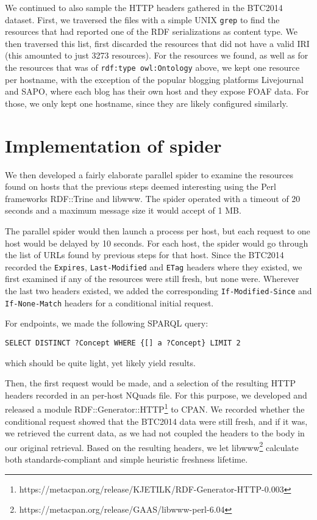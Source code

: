 \documentclass{article}
\newcommand{\rdfterm}[1]{\texttt{#1}}
\newcommand{\httph}[1]{\texttt{#1}}
\begin{document}
We continued to also sample the HTTP headers gathered in the BTC2014
dataset. 
First, we traversed the files with a simple UNIX \texttt{grep} to find
the resources that had reported one of the RDF serializations as
content type. We then traversed this list, first discarded the
resources that did not have a valid IRI (this amounted to just 3273
resources). For the resources we found, as well as for the resources
that was of \rdfterm{rdf:type owl:Ontology} above, we kept one
resource per hostname, with the exception of the popular blogging
platforms Livejournal and SAPO, where each blog has their own host and
they expose FOAF data. For those, we only kept one hostname, since
they are likely configured similarly. 

\section{Implementation of spider}\label{app:fetcher}

We then developed a fairly elaborate parallel spider to examine the
resources found on hosts that the previous steps deemed interesting
using the Perl frameworks RDF::Trine and libwww. The spider operated
with a timeout of 20 seconds and a maximum message size it would
accept of 1 MB.

The parallel spider would then launch a process per host, but each
request to one host would be delayed by 10 seconds. For each host, the
spider would go through the list of URLs found by previous steps for
that host. Since the BTC2014 recorded the \httph{Expires},
\httph{Last-Modified} and \httph{ETag} headers where they existed, we
first examined if any of the resources were still fresh, but none
were. Wherever the last two headers existed, we added the
corresponding \httph{If-Modified-Since} and \httph{If-None-Match}
headers for a conditional initial request.




For endpoints, we made the following SPARQL query:
\begin{verbatim}
SELECT DISTINCT ?Concept WHERE {[] a ?Concept} LIMIT 2
\end{verbatim}
which should be quite light, yet likely yield results.

Then, the first request would be made, and a selection of the
resulting HTTP headers recorded in an per-host NQuads file. For this
purpose, we developed and released a module
RDF::Generator::HTTP\footnote{https://metacpan.org/release/KJETILK/RDF-Generator-HTTP-0.003}
to CPAN. We recorded whether the conditional request showed that the
BTC2014 data were still fresh, and if it was, we retrieved the current
data, as we had not coupled the headers to the body in our original
retrieval.  Based on the resulting headers, we let
libwww\footnote{https://metacpan.org/release/GAAS/libwww-perl-6.04}
calculate both standards-compliant and simple heuristic freshness
lifetime.
\end{document}
